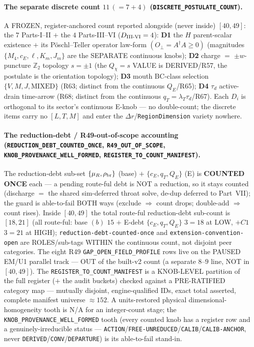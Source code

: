 \paragraph{The separate discrete count \(11\,(=7+4)\) (\texttt{DISCRETE\_POSTULATE\_COUNT}).}
A FROZEN, register-anchored count reported alongside (never inside) \([40,49]\): the
\(7\) Parts-I--II \(+\) the \(4\) Parts-III--VI (\(D_{\rm III\text{-}VI}=4\)):
\textbf{D1} the \(H\) parent-scalar existence \(+\) its Pöschl--Teller operator
law-form \((O_\perp=A^\dagger A\ge0)\) (magnitudes \(\{M_4,c_E,\ell,K_m,J_m\}\) are the
SEPARATE continuous knobs); \textbf{D2} charge \(=\) \(\pm w\)-puncture \(\mathbb Z_2\)
topology \(s=\pm1\) (the \(Q_\chi=s\) VALUE is DERIVED/R57, the postulate is the
orientation topology); \textbf{D3} mouth BC-class selection \(\{V,M,J,\text{MIXED}\}\)
(R63; distinct from the continuous \(Q_E\)/R65); \textbf{D4} \(\tau_d\) active-drain
time-arrow (R68; distinct from the continuous \(q_T=\lambda_T\tau_d\)/R67). Each
\(D_i\) is orthogonal to its sector's continuous E-knob --- no double-count; the
discrete items carry no \([L,T,M]\) and enter the \(\Delta r\)/\texttt{RegionDimension}
variety nowhere.

\paragraph{The reduction-debt / R49-out-of-scope accounting (\texttt{REDUCTION\_DEBT\_COUNTED\_ONCE}, \texttt{R49\_OUT\_OF\_SCOPE}, \texttt{KNOB\_PROVENANCE\_WELL\_FORMED}, \texttt{REGISTER\_TO\_COUNT\_MANIFEST}).}
The reduction-debt sub-set \(\{\mu_R,\rho_{\rm br}\}\) (base) \(+\)
\(\{c_E,q_T,Q_E\}\) (E) is \textbf{COUNTED ONCE} each --- a pending route-ful debt is
NOT a reduction, so it stays counted (discharge \(=\) the shared sim-deferred throat
solve, de-dup deferred to Part~VII); the guard is able-to-fail BOTH ways (exclude
\(\Rightarrow\) count drops; double-add \(\Rightarrow\) count rises). Inside
\([40,49]\) the total route-ful reduction-debt sub-count is \([18,21]\) (all
route-ful: base \((b)\) \(15\) \(+\) E-debt \(\{c_E,q_T,Q_E\}\) \(3=18\) at LOW,
\(+C1\) \(3=21\) at HIGH); \texttt{reduction-debt-counted-once} and
\texttt{extension-convention-open} are ROLES/sub-tags WITHIN the continuous count,
not disjoint peer categories. The eight R49 \texttt{GAP\_OPEN\_FIELD\_PROFILE} rows
live on the PAUSED EM/U1 parallel track --- OUT of the built-v2 count (a separate
\(8\)--\(9\) line, NOT in \([40,49]\)). The \texttt{REGISTER\_TO\_COUNT\_MANIFEST} is
a KNOB-LEVEL partition of the full register (\(+\) the audit buckets) checked against
a PRE-RATIFIED category map --- mutually disjoint, engine-qualified IDs, exact total
asserted, complete manifest universe \(\approx152\). A units-restored physical
dimensional-homogeneity tooth is N/A for an integer-count stage; the
\texttt{KNOB\_PROVENANCE\_WELL\_FORMED} tooth (every counted knob has a register row
and a genuinely-irreducible status --- \texttt{ACTION}/\texttt{FREE-UNREDUCED}/\texttt{CALIB}/\texttt{CALIB-ANCHOR},
never \texttt{DERIVED}/\texttt{CONV}/\texttt{DEPARTURE}) is its able-to-fail stand-in.

